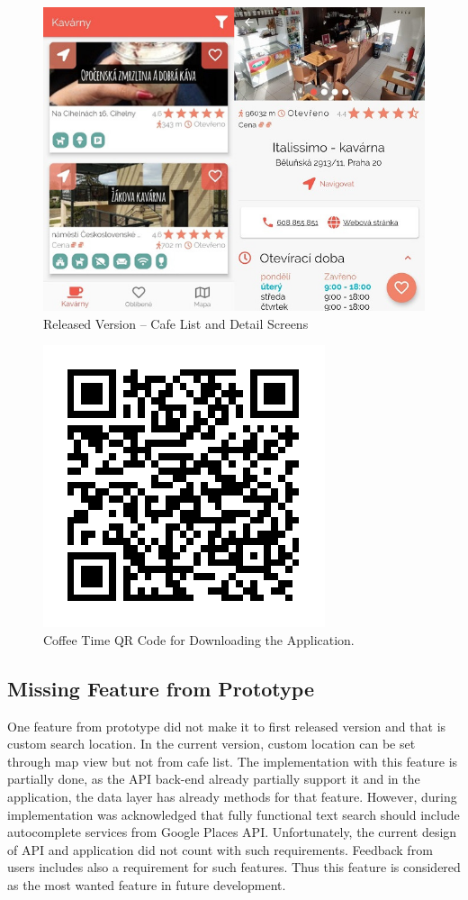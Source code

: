 \begin{figure}[h!]
    \centering
    \includegraphics[width=\textwidth]{img/deploy/app.jpg}
    \caption{Released Version -- Cafe List and Detail Screens}
    \label{fig:ct-released-version}
\end{figure}

\begin{figure}[h!]
    \centering
    \includegraphics[width=0.33\linewidth]{img/deploy/app-qr.pdf}
    \caption{Coffee Time QR Code for Downloading the Application.}
    \label{fig:ct-qr-code}
\end{figure}

\subsection{Missing Feature from Prototype}
One feature from prototype did not make it to first released version and that is custom search location. In the current version, custom location can be set through map view but not from cafe list. The implementation with this feature is partially done, as the API back-end already partially support it and in the application, the data layer has already methods for that feature.  
However, during implementation was acknowledged that fully functional text search should include autocomplete services from Google Places API. Unfortunately, the current design of API and application did not count with such requirements. Feedback from users includes also a requirement for such features. Thus this feature is considered as the most wanted feature in future development. 

